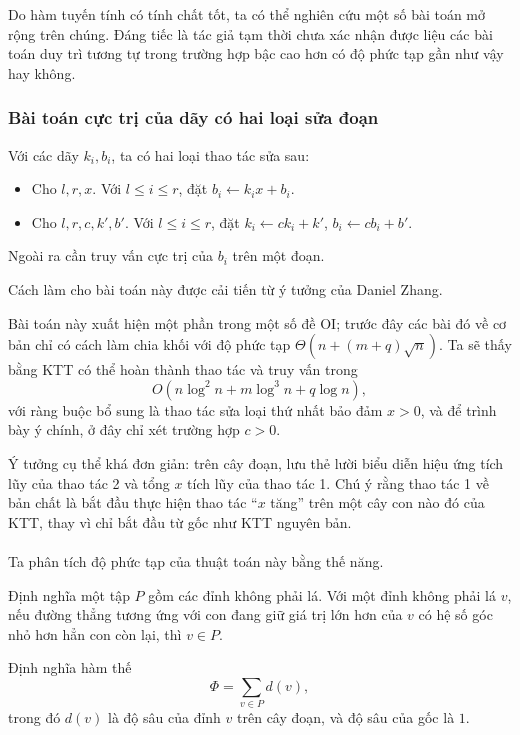 \documentclass[11pt]{article}
\begin{document}
Do hàm tuyến tính có tính chất tốt, ta có thể nghiên cứu một số bài toán mở rộng
trên chúng. Đáng tiếc là tác giả tạm thời chưa xác nhận được liệu các bài toán
duy trì tương tự trong trường hợp bậc cao hơn có độ phức tạp gần như vậy hay
không.

\subsubsection{Bài toán cực trị của dãy có hai loại sửa đoạn}

Với các dãy \(k_i,b_i\), ta có hai loại thao tác sửa sau:

\begin{itemize}
  \item Cho \(l,r,x\). Với \(l\le i\le r\), đặt \(b_i\gets k_ix+b_i\).
  \item Cho \(l,r,c,k',b'\). Với \(l\le i\le r\), đặt
  \(k_i\gets ck_i+k'\), \(b_i\gets cb_i+b'\).
\end{itemize}

Ngoài ra cần truy vấn cực trị của \(b_i\) trên một đoạn.

Cách làm cho bài toán này được cải tiến từ ý tưởng của Daniel Zhang.

Bài toán này xuất hiện một phần trong một số đề OI; trước đây các bài đó về cơ
bản chỉ có cách làm chia khối với độ phức tạp \(\Theta(n+(m+q)\sqrt n)\). Ta sẽ
thấy bằng KTT có thể hoàn thành thao tác và truy vấn trong
\[
  O(n\log^2 n+m\log^3 n+q\log n),
\]
với ràng buộc bổ sung là thao tác sửa loại thứ nhất bảo đảm \(x>0\), và để trình
bày ý chính, ở đây chỉ xét trường hợp \(c>0\).

Ý tưởng cụ thể khá đơn giản: trên cây đoạn, lưu thẻ lười biểu diễn hiệu ứng tích
lũy của thao tác 2 và tổng \(x\) tích lũy của thao tác 1. Chú ý rằng thao tác 1
về bản chất là bắt đầu thực hiện thao tác ``\(x\) tăng'' trên một cây con nào đó
của KTT, thay vì chỉ bắt đầu từ gốc như KTT nguyên bản.

\paragraph{}
Ta phân tích độ phức tạp của thuật toán này bằng thế năng.

Định nghĩa một tập \(P\) gồm các đỉnh không phải lá. Với một đỉnh không phải lá
\(v\), nếu đường thẳng tương ứng với con đang giữ giá trị lớn hơn của \(v\) có
hệ số góc nhỏ hơn hẳn con còn lại, thì \(v\in P\).

Định nghĩa hàm thế
\[
  \Phi=\sum_{v\in P} d(v),
\]
trong đó \(d(v)\) là độ sâu của đỉnh \(v\) trên cây đoạn, và độ sâu của gốc là
\(1\).
\end{document}
